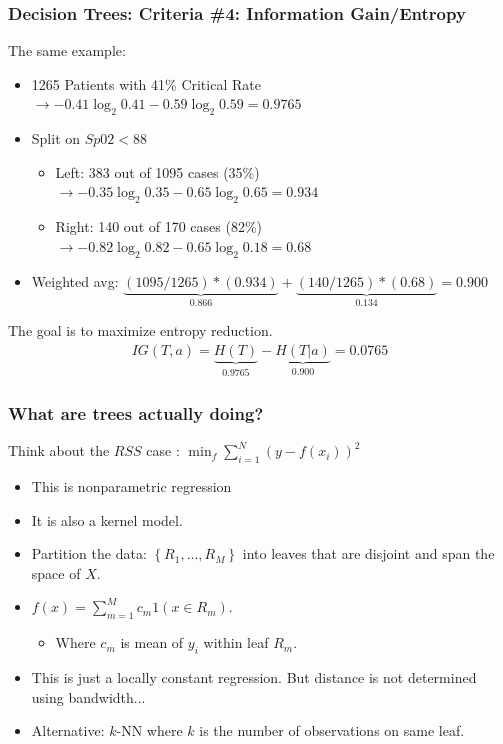 \documentclass[xcolor=pdftex,dvipsnames,table,mathserif,aspectratio=169]{beamer}
\begin{document}
\begin{frame}
\frametitle{Decision Trees: Criteria \#4: Information Gain/Entropy}
The same example:
\begin{itemize}
\item 1265 Patients with 41\% Critical Rate $\rightarrow  -0.41 \log_2 0.41 - 0.59 \log_2 0.59 = 0.9765 $
\item Split on $Sp02 < 88$
\begin{itemize} 
\item Left: 383 out of 1095 cases (35\%) $\rightarrow  -0.35 \log_2 0.35 - 0.65 \log_2 0.65 = 0.934 $
\item Right: 140 out of 170 cases (82\%) $\rightarrow  -0.82 \log_2 0.82 - 0.65 \log_2 0.18 = 0.68 $
\end{itemize}
\item Weighted avg: $\underbrace{(1095/1265)*(0.934)}_{0.866} + \underbrace{(140/1265)*(0.68)}_{0.134} = 0.900$
\end{itemize}
The goal is to maximize \alert{entropy reduction}.
\begin{align*}
IG(T,a) =   \underbrace{H(T)}_{0.9765} -\underbrace{H(T | a)}_{0.900} = 0.0765
\end{align*}
\end{frame}


\begin{frame}
\frametitle{What are trees actually doing?}
Think about the $RSS$ case : $\min_f \sum_{i=1}^N (y - f(x_i))^2$
\begin{itemize}
\item This is \alert{nonparametric regression}
\item It is also a \alert{kernel model}.
\item Partition the data: $\left\{R_{1}, \ldots, R_{M}\right\}$ into \alert{leaves} that are \alert{disjoint} and \alert{span the space} of $X$.
\item $ f(x)=\sum_{m=1}^{M} c_{m} 1\left(x \in R_{m}\right)$. 
\begin{itemize}
\item Where $c_m$ is mean of $y_i$ within leaf $R_m$.
\end{itemize}
\item This is just a \alert{locally constant} regression. But distance is not determined using bandwidth...
\item Alternative: $k$-NN where $k$ is the number of observations on same leaf.
\end{itemize}
\end{frame}
\end{document}
